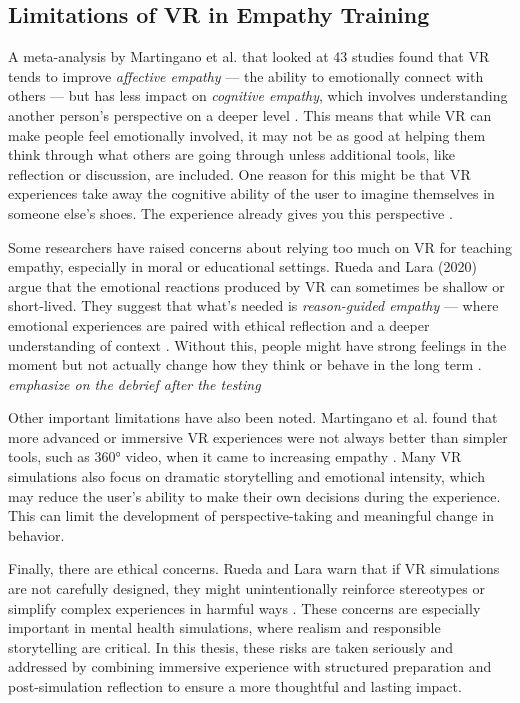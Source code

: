 \subsection{Limitations of VR in Empathy Training}

A meta-analysis by Martingano et al. that looked at 43 studies found that VR tends to improve \textit{affective empathy} — the ability to emotionally connect with others — but has less impact on \textit{cognitive empathy}, which involves understanding another person’s perspective on a deeper level \cite{Martingano2021}. This means that while VR can make people feel emotionally involved, it may not be as good at helping them think through what others are going through unless additional tools, like reflection or discussion, are included. One reason for this might be that VR experiences take away the cognitive ability of the user to imagine themselves in someone else's shoes. The experience already gives you this perspective \cite{Martingano2021}. 

Some researchers have raised concerns about relying too much on VR for teaching empathy, especially in moral or educational settings. Rueda and Lara (2020) argue that the emotional reactions produced by VR can sometimes be shallow or short-lived. They suggest that what’s needed is \textit{reason-guided empathy} — where emotional experiences are paired with ethical reflection and a deeper understanding of context \cite{Rueda2020}. Without this, people might have strong feelings in the moment but not actually change how they think or behave in the long term \cite{Martingano2021}. \emph{emphasize on the debrief after the testing}

Other important limitations have also been noted. Martingano et al. found that more advanced or immersive VR experiences were not always better than simpler tools, such as 360° video, when it came to increasing empathy \cite{Martingano2021}. Many VR simulations also focus on dramatic storytelling and emotional intensity, which may reduce the user’s ability to make their own decisions during the experience. This can limit the development of perspective-taking and meaningful change in behavior.

Finally, there are ethical concerns. Rueda and Lara warn that if VR simulations are not carefully designed, they might unintentionally reinforce stereotypes or simplify complex experiences in harmful ways \cite{Rueda2020}. These concerns are especially important in mental health simulations, where realism and responsible storytelling are critical. In this thesis, these risks are taken seriously and addressed by combining immersive experience with structured preparation and post-simulation reflection to ensure a more thoughtful and lasting impact.

